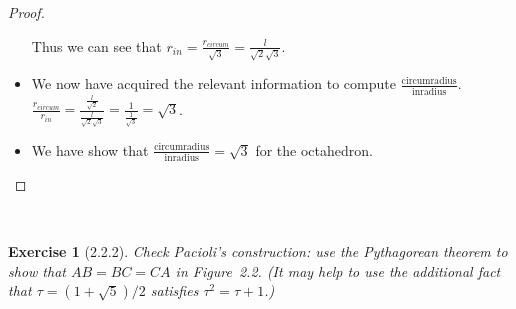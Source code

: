 \documentclass[12pt]{article}
\newcommand{\XB}{\color{black}}
\newcommand{\XBB}{\color{blue}}
\theoremstyle{plain}
\newtheorem{ex}{Exercise}
\begin{document}
\begin{proof}
\begin{itemize}
  \subitem Thus we can see that $ \displaystyle r_{in} = \frac{r_{circum}}{\sqrt{3}} = \frac{l}{\sqrt{2}\sqrt{3}} $.
  \item We now have acquired the relevant information to compute $\displaystyle \frac{\text{circumradius}}{\text{inradius}}$.
  \subitem $\displaystyle \frac{r_{circum}}{r_{in}} = \frac{\frac{l}{\sqrt{2}}}{\frac{l}{\sqrt{2}\sqrt{3}}} = \frac{1}{\frac{1}{\sqrt{3}}} = \sqrt{3}$.
  \item We have show that $\displaystyle \frac{\text{circumradius}}{\text{inradius}}=\sqrt{3}$ for the octahedron.
\end{itemize}
\end{proof}

\newpage
\XBB\hrulefill\XB \\
\begin{ex} [2.2.2]
  Check Pacioli's construction: use the Pythagorean theorem to show that $AB=BC=CA$ in Figure~2.2. (It may help to use the additional fact that $\tau=(1+\sqrt{5})/2$ satisfies $\tau^2=\tau+1$.)
\end{ex}
\XBB\hrulefill\XB \\
\end{document}
